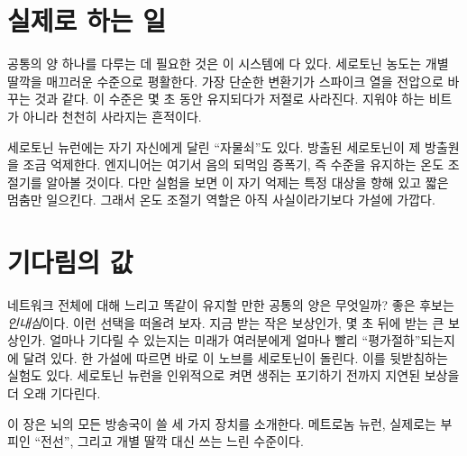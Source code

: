 \section*{실제로 하는 일}

공통의 양 하나를 다루는 데 필요한 것은 이 시스템에 다 있다. 세로토닌 농도는 개별 딸깍을 매끄러운 수준으로 평활한다. 가장 단순한 변환기가 스파이크 열을 전압으로 바꾸는 것과 같다. 이 수준은 몇 초 동안 유지되다가 저절로 사라진다. 지워야 하는 비트가 아니라 천천히 사라지는 흔적이다.

세로토닌 뉴런에는 자기 자신에게 달린 “자물쇠”도 있다. 방출된 세로토닌이 제 방출원을 조금 억제한다. 엔지니어는 여기서 음의 되먹임 증폭기, 즉 수준을 유지하는 온도 조절기를 알아볼 것이다. 다만 실험을 보면 이 자기 억제는 특정 대상을 향해 있고 짧은 멈춤만 일으킨다. 그래서 온도 조절기 역할은 아직 사실이라기보다 가설에 가깝다.

\section*{기다림의 값}

네트워크 전체에 대해 느리고 똑같이 유지할 만한 공통의 양은 무엇일까? 좋은 후보는 \emph{인내심}이다. 이런 선택을 떠올려 보자. 지금 받는 작은 보상인가, 몇 초 뒤에 받는 큰 보상인가. 얼마나 기다릴 수 있는지는 미래가 여러분에게 얼마나 빨리 “평가절하”되는지에 달려 있다. 한 가설에 따르면 바로 이 노브를 세로토닌이 돌린다. 이를 뒷받침하는 실험도 있다. 세로토닌 뉴런을 인위적으로 켜면 생쥐는 포기하기 전까지 지연된 보상을 더 오래 기다린다.

이 장은 뇌의 모든 방송국이 쓸 세 가지 장치를 소개한다. 메트로놈 뉴런, 실제로는 부피인 “전선”, 그리고 개별 딸깍 대신 쓰는 느린 수준이다.

